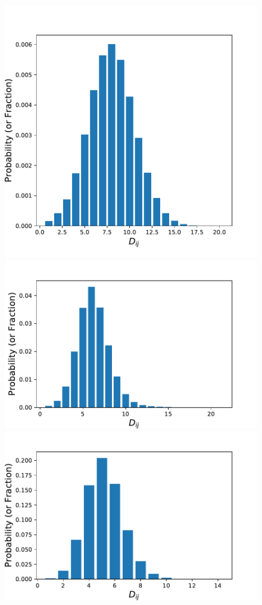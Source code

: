\documentclass[aps, pre, twocolumn, nofootinbib]{revtex4-1}
\begin{document}
\begin{figure}[htbp]  
	\centering
		
	\includegraphics[scale = 0.33]{plots/Dij_dist_hist_1990}
	\includegraphics[scale = 0.33]{plots/Dij_dist_hist_2000}
	\includegraphics[scale = 0.33]{plots/Dij_dist_hist_2013}
	

\end{figure}
\end{document}
